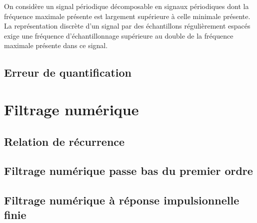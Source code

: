 \documentclass[10pt,fleqn]{article} %
\begin{document}
\begin{theorem}
On considère un signal périodique décomposable en signaux périodiques dont la fréquence maximale présente est largement supérieure à celle minimale présente.
La représentation discrète d’un signal par des échantillons régulièrement espacés exige une fréquence d’échantillonnage supérieure au double de la fréquence maximale présente dans ce signal.
\end{theorem}


\subsection{Erreur de quantification}
\section{Filtrage numérique}

\subsection{Relation de récurrence}
\subsection{Filtrage numérique passe bas du premier ordre}
\subsection{Filtrage numérique à réponse impulsionnelle finie}
\begin{thebibliography}{2}
\end{thebibliography}
\end{document}
